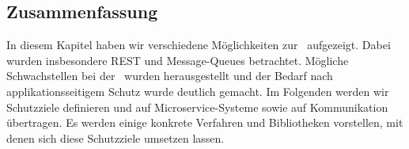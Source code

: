\subsection{Zusammenfassung}

In diesem Kapitel haben wir verschiedene Möglichkeiten zur \stscom\ aufgezeigt. Dabei wurden insbesondere REST und Message-Queues betrachtet. Mögliche Schwachstellen bei der \stscom\ wurden herausgestellt und der Bedarf nach applikationsseitigem Schutz wurde deutlich gemacht. Im Folgenden werden wir Schutzziele definieren und auf Microservice-Systeme sowie auf Kommunikation übertragen. Es werden einige konkrete Verfahren und Bibliotheken vorstellen, mit denen sich diese Schutzziele umsetzen lassen. 